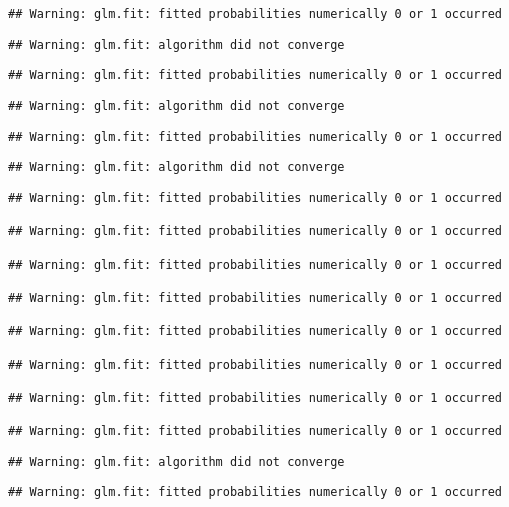 \documentclass[
]{article}
\begin{document}
\begin{verbatim}
## Warning: glm.fit: fitted probabilities numerically 0 or 1 occurred
\end{verbatim}

\begin{verbatim}
## Warning: glm.fit: algorithm did not converge
\end{verbatim}

\begin{verbatim}
## Warning: glm.fit: fitted probabilities numerically 0 or 1 occurred
\end{verbatim}

\begin{verbatim}
## Warning: glm.fit: algorithm did not converge
\end{verbatim}

\begin{verbatim}
## Warning: glm.fit: fitted probabilities numerically 0 or 1 occurred
\end{verbatim}

\begin{verbatim}
## Warning: glm.fit: algorithm did not converge
\end{verbatim}

\begin{verbatim}
## Warning: glm.fit: fitted probabilities numerically 0 or 1 occurred

## Warning: glm.fit: fitted probabilities numerically 0 or 1 occurred

## Warning: glm.fit: fitted probabilities numerically 0 or 1 occurred

## Warning: glm.fit: fitted probabilities numerically 0 or 1 occurred

## Warning: glm.fit: fitted probabilities numerically 0 or 1 occurred

## Warning: glm.fit: fitted probabilities numerically 0 or 1 occurred

## Warning: glm.fit: fitted probabilities numerically 0 or 1 occurred

## Warning: glm.fit: fitted probabilities numerically 0 or 1 occurred
\end{verbatim}

\begin{verbatim}
## Warning: glm.fit: algorithm did not converge
\end{verbatim}

\begin{verbatim}
## Warning: glm.fit: fitted probabilities numerically 0 or 1 occurred
\end{verbatim}
\end{document}
